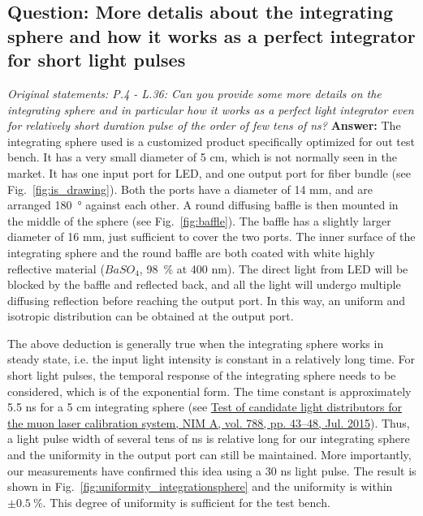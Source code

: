 \documentclass[]{article}
\begin{document}
\subsection{Question: More detalis about the integrating sphere and how it works as a perfect integrator for short light pulses}
\textit{Original statements: P.4 - L.36: Can you provide some more details on the integrating sphere and in particular how it works as a perfect light integrator even for relatively short duration pulse of the order of few tens of ns?}\newline
\textbf{Answer:} \newline
The integrating sphere used is a customized product specifically optimized for out test bench. It has a very small diameter of 5 cm, which is not normally seen in the market. It has one input port for LED, and one output port for fiber bundle (see Fig.~\ref{fig:is_drawing}). Both the ports have a diameter of 14 mm, and are arranged \SI{180}{\degree} against each other. A round diffusing baffle is then mounted in the middle of the sphere (see Fig.~\ref{fig:baffle}). The baffle has a slightly larger diameter of 16 mm, just sufficient to cover the two ports. The inner surface of the integrating sphere and the round baffle are both coated with white highly reflective material ($BaSO_4$, \SI{98}{\percent} at 400 nm). The direct light from LED will be blocked by the baffle and reflected back, and all the light will undergo multiple diffusing reflection before reaching the output port. In this way, an uniform and isotropic distribution can be obtained at the output port.

The above deduction is generally true when the integrating sphere works in steady state, i.e. the input light intensity is constant in a relatively long time. For short light pulses, the temporal response of the integrating sphere needs to be considered, which is of the exponential form. The time constant is approximately 5.5 ns for a 5 cm integrating sphere (see \href{http://www.sciencedirect.com/science/article/pii/S016890021500426X/pdfft?md5=6c1ff96a0c12fd90667d756f698abbfc&pid=1-s2.0-S016890021500426X-main.pdf} {Test of candidate light distributors for the muon laser calibration system, NIM A, vol. 788, pp. 43–48, Jul. 2015}). Thus, a light pulse width of several tens of ns is relative long for our integrating sphere and the uniformity in the output port can still be maintained. More importantly, our measurements have confirmed this idea using a 30 ns light pulse.
The result is shown in Fig.~\ref{fig:uniformity_integrationsphere} and the uniformity is within $\pm\SI{0.5}{\percent}$. This degree of uniformity is sufficient for the test bench.
\end{document}
